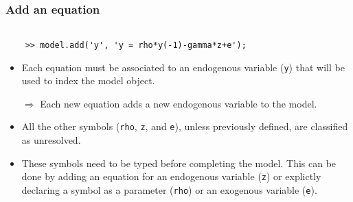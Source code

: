 \documentclass[10pt,slidestop]{beamer}
\theoremstyle{plain}
\begin{document}
\begin{frame}[c,fragile]
  \frametitle{Add an equation}

  \begin{lstlisting}[style=MatlabConsole]

    >> model.add('y', 'y = rho*y(-1)-gamma*z+e');
   \end{lstlisting}

   \bigskip

  \begin{itemize}

  \item Each equation must be associated to an endogenous variable (\verb+y+) that will be used to index the model object.\newline

  \item[$\Rightarrow$] Each new equation adds a new endogenous variable to the model.\newline

  \item All the other symbols (\verb+rho+, \verb+z+, and \verb+e+), unless previously defined, are classified as unresolved.\newline

  \item These symbols need to be typed before completing the model. This can be done by adding an equation for an endogenous variable (\verb+z+) or explictly declaring a symbol as a parameter (\verb+rho+) or an exogenous variable (\verb+e+).

  \end{itemize}

\end{frame}
\end{document}
